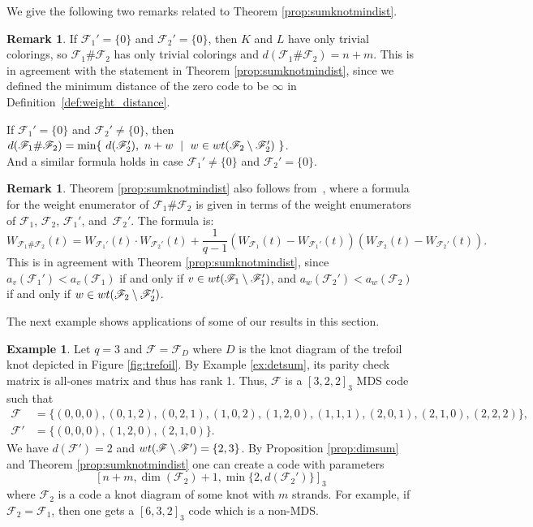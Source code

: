 \documentclass[11pt,a4paper]{article}
\newcommand{\wt}{\textnormal{wt}}
\theoremstyle{definition}
\newtheorem{example}[theorem]{Example}
\newtheorem{remark}[theorem]{Remark}
\newcommand{\mF}{\mathcal{F}}
\begin{document}
We give the following two remarks related to Theorem \ref{prop:sumknotmindist}.

\begin{remark}
If $\mF_1' =\{0\}$ and $\mF_2' =\{0\}$, then $K$ and $L$ have only trivial colorings, so $ \mF_1 \# \mF_2$ has only trivial colorings and $d(\mF_1 \# \mF_2)= n+ m$.
This is in agreement with the statement in Theorem \ref{prop:sumknotmindist}, since we defined the minimum distance of the zero code to be $\infty$ in Definition~\ref{def:weight_distance}.

If $\mF_1' =\{0\}$ and $\mF_2' \not=\{0\}$, then $d(\mF_1 \# \mF_2)=\min \{ \   d(\mF_2'),\ n+w \ \mid \ w \in \wt(\mF_2 \setminus \mF_2')\  \}$.\\
And a similar formula holds in case $\mF_1' \not=\{0\}$ and $\mF_2' =\{0\}$.
\end{remark}


\begin{remark}
Theorem \ref{prop:sumknotmindist} also follows from~\cite[Proposition 6.1.1]{nijsten2022knots}, 
where a formula for the weight enumerator of $\mF_1 \# \mF_2$ is given in terms of the weight enumerators of $\mF_1 $, $\mF_2$, $\mF_1'$, and~$\mF_2'$.
The formula is: 
$$
W_{\mF_1 \# \mF_2}(t) = W_{\mF_1'}(t)\cdot W_{\mF_2'}(t) + \frac{1}{q - 1} (W_{\mF_1}(t) - W_{\mF_1'}(t))(W_{\mF_2}(t) - W_{\mF_2'}(t)).
$$
This is in agreement with Theorem \ref{prop:sumknotmindist}, since $a_v(\mF_1') < a_v(\mF_1)$ if and only if $ v\in \wt(\mF_1 \setminus \mF_1')$,
and $a_w(\mF_2') < a_w(\mF_2)$ if and only if $w \in \wt(\mF_2 \setminus \mF_2')$.
\end{remark}

The next example shows applications of some of our results in this section.
\begin{example}
Let $q=3$ and $\mF=\mF_D$ where $D$ is the knot diagram of the trefoil knot depicted in Figure \ref{fig:trefoil}. By Example \ref{ex:detsum}, its parity check matrix is all-ones matrix and thus has rank 1. Thus, $\mF$ is a $[3,2,2]_3$ MDS code such that
\begin{align*}
    \mF &= \{(0,0,0),(0,1,2),(0,2,1),(1,0,2),(1,2,0),(1,1,1),(2,0,1),(2,1,0),(2,2,2)\}, \\
    \mF' &= \{(0,0,0),(1,2,0),(2,1,0)\}.
\end{align*}
We have $d(\mF')=2$ and $\wt(\mF \setminus \mF') = \{2,3\}$. By Proposition \ref{prop:dimsum} and Theorem \ref{prop:sumknotmindist} one can create a code with parameters
$$[n+m, \dim(\mF_2)+1, \min\{2,d(\mF_2')\}]_3$$
where $\mF_2$ is a code a knot diagram of some knot with $m$ strands. For example, if $\mF_2 = \mF_1$, then one gets a $[6,3,2]_3$ code which is a non-MDS. \end{example}
\end{document}
